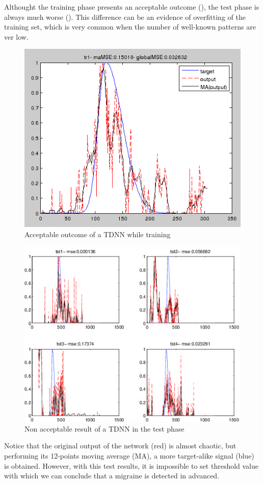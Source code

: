 Althought the training phase presents an acceptable outcome (), the test phase is always much worse (). This difference can be an evidence of overfitting of the training set, which is very common when the number of well-known patterns are ver low.

\begin{figure}[!ht]
\centering
\includegraphics[width=0.7\columnwidth]{images/results/tdnnTraining}
\caption{Acceptable outcome of a TDNN while training}
\label{fig:tdnntraining}
\end{figure}

\begin{figure}[!ht]
\centering
\includegraphics[width=0.9\columnwidth]{images/results/tdnnTest}
\caption{Non acceptable result of a TDNN in the test phase}
\label{fig:tdnntest}
\end{figure}

Notice that the original output of the network (red) is almost chaotic, but performing its 12-points moving average (MA), a more target-alike signal (blue) is obtained. However, with this test results, it is impossible to set threshold value with which we can conclude that a migraine is detected in advanced.




